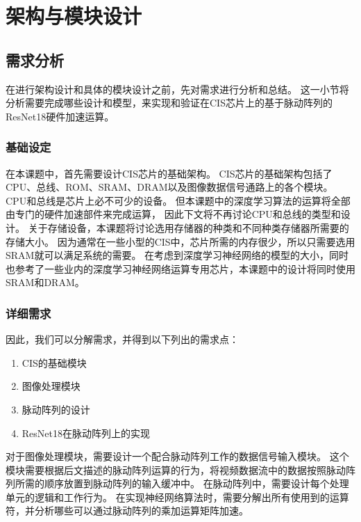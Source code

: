 
\chapter{架构与模块设计}

\section{需求分析}
在进行架构设计和具体的模块设计之前，先对需求进行分析和总结。
这一小节将分析需要完成哪些设计和模型，来实现和验证在CIS芯片上的基于脉动阵列的ResNet18硬件加速运算。


\subsection{基础设定}

在本课题中，首先需要设计CIS芯片的基础架构。
CIS芯片的基础架构包括了CPU、总线、ROM、SRAM、DRAM以及图像数据信号通路上的各个模块。
CPU和总线是芯片上必不可少的设备。
但本课题中的深度学习算法的运算将全部由专门的硬件加速部件来完成运算，
因此下文将不再讨论CPU和总线的类型和设计。
关于存储设备，本课题将讨论选用存储器的种类和不同种类存储器所需要的存储大小。
因为通常在一些小型的CIS中，芯片所需的内存很少，所以只需要选用SRAM就可以满足系统的需要。
在考虑到深度学习神经网络的模型的大小，同时也参考了一些业内的深度学习神经网络运算专用芯片，本课题中的设计将同时使用SRAM和DRAM。


\subsection{详细需求}

因此，我们可以分解需求，并得到以下列出的需求点：
\begin{enumerate}
    \item CIS的基础模块
    \item 图像处理模块
    \item 脉动阵列的设计
    \item ResNet18在脉动阵列上的实现
\end{enumerate}    

对于图像处理模块，需要设计一个配合脉动阵列工作的数据信号输入模块。
这个模块需要根据后文描述的脉动阵列运算的行为，将视频数据流中的数据按照脉动阵列所需的顺序放置到脉动阵列的输入缓冲中。
在脉动阵列中，需要设计每个处理单元的逻辑和工作行为。
在实现神经网络算法时，需要分解出所有使用到的运算符，并分析哪些可以通过脉动阵列的乘加运算矩阵加速。


